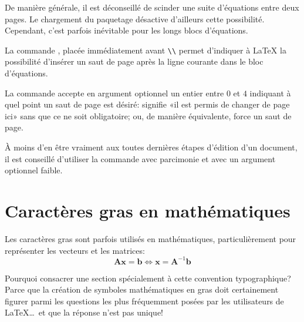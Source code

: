 \begin{conseil}
  De manière générale, il est déconseillé de scinder une suite
  d'équations entre deux pages. Le chargement du paquetage
   désactive d'ailleurs cette possibilité. Cependant,
  c'est parfois inévitable pour les longs blocs d'équations.

  La commande \cmd{\displaybreak}, placée immédiatement avant
  \verb=\\= permet d'indiquer à {\LaTeX} la possibilité d'insérer un
  saut de page après la ligne courante dans le bloc d'équations.

  La commande accepte en argument optionnel un entier entre $0$ et $4$
  indiquant à quel point un saut de page est désiré:
  \cmdprint{\displaybreak[0]} signifie «il est permis de changer de
  page ici» sans que ce ne soit obligatoire;
  \cmdprint{\displaybreak[4]} ou, de manière équivalente,
  \cmdprint{\displaybreak} force un saut de page.

  À moins d'en être vraiment aux toutes dernières étapes d'édition
  d'un document, il est conseillé d'utiliser la commande
  \cmdprint{\displaybreak} avec parcimonie et avec un argument
  optionnel faible.
\end{conseil}


\section{Caractères gras en mathématiques}
\label{sec:math:gras}

Les caractères gras sont parfois utilisés en mathématiques,
particulièrement pour représenter les vecteurs et les matrices:
\begin{equation*}
  \symbf{A} \symbf{x} = \symbf{b} \Leftrightarrow
  \symbf{x} = \symbf{A}^{-1} \symbf{b}
\end{equation*}

Pourquoi consacrer une section spécialement à cette convention
typographique? Parce que la création de symboles mathématiques en
gras doit certainement figurer parmi les questions les plus
fréquemment posées par les utilisateurs de {\LaTeX}\dots\ et que la
réponse n'est pas unique!

